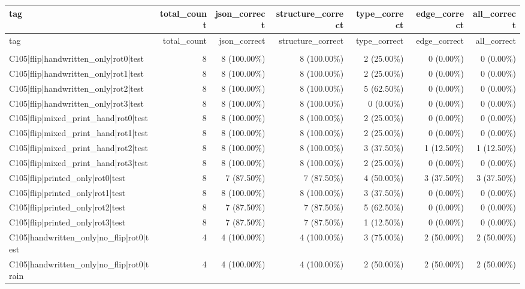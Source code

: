\begin{longtable}{>{\raggedright\arraybackslash}p{5cm}rrrrrr}
\toprule
tag & total\_count & json\_correct & structure\_correct & type\_correct & edge\_correct & all\_correct \\
\midrule
\endfirsthead
\toprule
tag & total\_count & json\_correct & structure\_correct & type\_correct & edge\_correct & all\_correct \\
\midrule
\endhead
\midrule
\multicolumn{7}{r}{Continued on next page} \\
\midrule
\endfoot
\bottomrule
\endlastfoot
C105|flip|handwritten\_only|rot0|test & 8 & 8 (100.00\%) & 8 (100.00\%) & 2 (25.00\%) & 0 (0.00\%) & 0 (0.00\%) \\
C105|flip|handwritten\_only|rot1|test & 8 & 8 (100.00\%) & 8 (100.00\%) & 2 (25.00\%) & 0 (0.00\%) & 0 (0.00\%) \\
C105|flip|handwritten\_only|rot2|test & 8 & 8 (100.00\%) & 8 (100.00\%) & 5 (62.50\%) & 0 (0.00\%) & 0 (0.00\%) \\
C105|flip|handwritten\_only|rot3|test & 8 & 8 (100.00\%) & 8 (100.00\%) & 0 (0.00\%) & 0 (0.00\%) & 0 (0.00\%) \\
C105|flip|mixed\_print\_hand|rot0|test & 8 & 8 (100.00\%) & 8 (100.00\%) & 2 (25.00\%) & 0 (0.00\%) & 0 (0.00\%) \\
C105|flip|mixed\_print\_hand|rot1|test & 8 & 8 (100.00\%) & 8 (100.00\%) & 2 (25.00\%) & 0 (0.00\%) & 0 (0.00\%) \\
C105|flip|mixed\_print\_hand|rot2|test & 8 & 8 (100.00\%) & 8 (100.00\%) & 3 (37.50\%) & 1 (12.50\%) & 1 (12.50\%) \\
C105|flip|mixed\_print\_hand|rot3|test & 8 & 8 (100.00\%) & 8 (100.00\%) & 2 (25.00\%) & 0 (0.00\%) & 0 (0.00\%) \\
C105|flip|printed\_only|rot0|test & 8 & 7 (87.50\%) & 7 (87.50\%) & 4 (50.00\%) & 3 (37.50\%) & 3 (37.50\%) \\
C105|flip|printed\_only|rot1|test & 8 & 8 (100.00\%) & 8 (100.00\%) & 3 (37.50\%) & 0 (0.00\%) & 0 (0.00\%) \\
C105|flip|printed\_only|rot2|test & 8 & 7 (87.50\%) & 7 (87.50\%) & 5 (62.50\%) & 0 (0.00\%) & 0 (0.00\%) \\
C105|flip|printed\_only|rot3|test & 8 & 7 (87.50\%) & 7 (87.50\%) & 1 (12.50\%) & 0 (0.00\%) & 0 (0.00\%) \\
C105|handwritten\_only|no\_flip|rot0|test & 4 & 4 (100.00\%) & 4 (100.00\%) & 3 (75.00\%) & 2 (50.00\%) & 2 (50.00\%) \\
C105|handwritten\_only|no\_flip|rot0|train & 4 & 4 (100.00\%) & 4 (100.00\%) & 2 (50.00\%) & 2 (50.00\%) & 2 (50.00\%) \\

\end{longtable}

